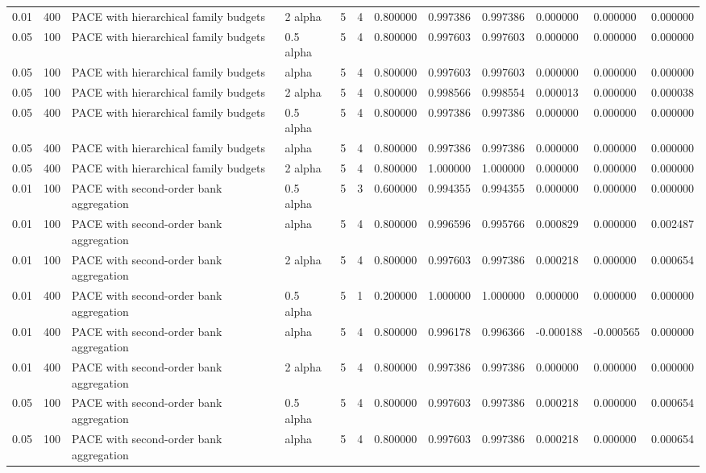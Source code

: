 \begin{tabular}{llllllllllll}
0.01 & 400 & PACE with hierarchical family budgets & 2 alpha & 5 & 4 & 0.800000 & 0.997386 & 0.997386 & 0.000000 & 0.000000 & 0.000000 \\
0.05 & 100 & PACE with hierarchical family budgets & 0.5 alpha & 5 & 4 & 0.800000 & 0.997603 & 0.997603 & 0.000000 & 0.000000 & 0.000000 \\
0.05 & 100 & PACE with hierarchical family budgets & alpha & 5 & 4 & 0.800000 & 0.997603 & 0.997603 & 0.000000 & 0.000000 & 0.000000 \\
0.05 & 100 & PACE with hierarchical family budgets & 2 alpha & 5 & 4 & 0.800000 & 0.998566 & 0.998554 & 0.000013 & 0.000000 & 0.000038 \\
0.05 & 400 & PACE with hierarchical family budgets & 0.5 alpha & 5 & 4 & 0.800000 & 0.997386 & 0.997386 & 0.000000 & 0.000000 & 0.000000 \\
0.05 & 400 & PACE with hierarchical family budgets & alpha & 5 & 4 & 0.800000 & 0.997386 & 0.997386 & 0.000000 & 0.000000 & 0.000000 \\
0.05 & 400 & PACE with hierarchical family budgets & 2 alpha & 5 & 4 & 0.800000 & 1.000000 & 1.000000 & 0.000000 & 0.000000 & 0.000000 \\
0.01 & 100 & PACE with second-order bank aggregation & 0.5 alpha & 5 & 3 & 0.600000 & 0.994355 & 0.994355 & 0.000000 & 0.000000 & 0.000000 \\
0.01 & 100 & PACE with second-order bank aggregation & alpha & 5 & 4 & 0.800000 & 0.996596 & 0.995766 & 0.000829 & 0.000000 & 0.002487 \\
0.01 & 100 & PACE with second-order bank aggregation & 2 alpha & 5 & 4 & 0.800000 & 0.997603 & 0.997386 & 0.000218 & 0.000000 & 0.000654 \\
0.01 & 400 & PACE with second-order bank aggregation & 0.5 alpha & 5 & 1 & 0.200000 & 1.000000 & 1.000000 & 0.000000 & 0.000000 & 0.000000 \\
0.01 & 400 & PACE with second-order bank aggregation & alpha & 5 & 4 & 0.800000 & 0.996178 & 0.996366 & -0.000188 & -0.000565 & 0.000000 \\
0.01 & 400 & PACE with second-order bank aggregation & 2 alpha & 5 & 4 & 0.800000 & 0.997386 & 0.997386 & 0.000000 & 0.000000 & 0.000000 \\
0.05 & 100 & PACE with second-order bank aggregation & 0.5 alpha & 5 & 4 & 0.800000 & 0.997603 & 0.997386 & 0.000218 & 0.000000 & 0.000654 \\
0.05 & 100 & PACE with second-order bank aggregation & alpha & 5 & 4 & 0.800000 & 0.997603 & 0.997386 & 0.000218 & 0.000000 & 0.000654 \\

\end{tabular}
